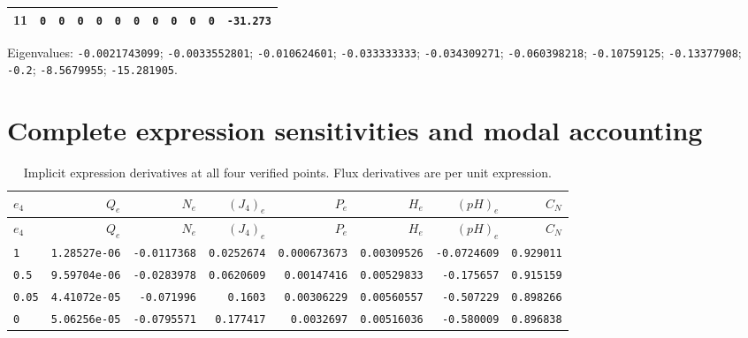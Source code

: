 \begin{landscape}
\begin{tabular}{rrrrrrrrrrrr}
11 & \texttt{0} & \texttt{0} & \texttt{0} & \texttt{0} & \texttt{0} & \texttt{0} & \texttt{0} & \texttt{0} & \texttt{0} & \texttt{0} & \texttt{-31.273} \\

\bottomrule\end{tabular}\par\endgroup

{\scriptsize Eigenvalues: \texttt{-0.0021743099}; \texttt{-0.0033552801}; \texttt{-0.010624601}; \texttt{-0.033333333}; \texttt{-0.034309271}; \texttt{-0.060398218}; \texttt{-0.10759125}; \texttt{-0.13377908}; \texttt{-0.2}; \texttt{-8.5679955}; \texttt{-15.281905}.\par}

\end{landscape}


\section{Complete expression sensitivities and modal accounting}

\begingroup\scriptsize
\setlength{\tabcolsep}{3pt}
\begin{longtable}{lrrrrrrr}
\caption{Implicit expression derivatives at all four verified points. Flux derivatives are per unit expression.}\\
\toprule
$e_4$ & $Q_e$ & $N_e$ & $(J_4)_e$ & $P_e$ & $H_e$ & $(pH)_e$ & $C_N$ \\
\midrule\endfirsthead
\toprule
$e_4$ & $Q_e$ & $N_e$ & $(J_4)_e$ & $P_e$ & $H_e$ & $(pH)_e$ & $C_N$ \\
\midrule\endhead
\bottomrule\endfoot
\texttt{1} & \texttt{1.28527e-06} & \texttt{-0.0117368} & \texttt{0.0252674} & \texttt{0.000673673} & \texttt{0.00309526} & \texttt{-0.0724609} & \texttt{0.929011} \\
\texttt{0.5} & \texttt{9.59704e-06} & \texttt{-0.0283978} & \texttt{0.0620609} & \texttt{0.00147416} & \texttt{0.00529833} & \texttt{-0.175657} & \texttt{0.915159} \\
\texttt{0.05} & \texttt{4.41072e-05} & \texttt{-0.071996} & \texttt{0.1603} & \texttt{0.00306229} & \texttt{0.00560557} & \texttt{-0.507229} & \texttt{0.898266} \\
\texttt{0} & \texttt{5.06256e-05} & \texttt{-0.0795571} & \texttt{0.177417} & \texttt{0.0032697} & \texttt{0.00516036} & \texttt{-0.580009} & \texttt{0.896838} \\
\end{longtable}
\endgroup


